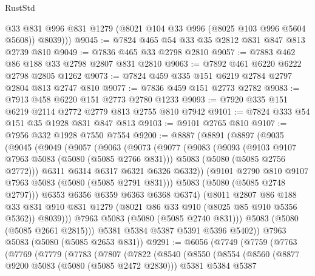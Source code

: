 \begin{lexlean}{RustStd}
\begin{coremodule}
{\begin{coremodule}
{{{{{          @33
          @831
          @996
          @831
          @1279
          (@8021 @104 @33 @996 (@8025 @103 @996 @5604 @5608))
          @8039)))
@9045 := @7824 @465 @54 @33 @35 @2812 @831 @847 @813 @2739 @810
@9049 := @7836 @465 @33 @2798 @2810
@9057 := @7883 @462 @86 @188 @33 @2798 @2807 @831 @2810
@9063 := @7892 @461 @6220 @6222 @2798 @2805 @1262
@9073 := @7824 @459 @335 @151 @6219 @2784 @2797 @2804 @813 @2747 @810
@9077 := @7836 @459 @151 @2773 @2782
@9083 := @7913 @458 @6220 @151 @2773 @2780 @1233
@9093 := @7920 @335 @151 @6219 @2114 @2772 @2779 @813 @2755 @810 @7942
@9101 := @7824 @333 @54 @151 @35 @1928 @831 @847 @813
@9103 := @9101 @2765 @810
@9107 := @7956 @332 @1928 @7550 @7554
@9200 := @8887
    (@8891
      (@8897
        (@9035
          (@9045
            (@9049
              (@9057
                (@9063
                  (@9073
                    (@9077
                      (@9083
                        (@9093
                          (@9103 @9107 @7963 @5083 (@5080 (@5085 @2766 @831)))
                          @5083
                          (@5080 (@5085 @2756 @2772)))
                        @6311
                        @6314
                        @6317
                        @6321
                        @6326
                        @6332))
                    (@9101 @2790 @810 @9107 @7963 @5083 (@5080 (@5085 @2791 @831)))
                    @5083
                    (@5080 (@5085 @2748 @2797)))
                  @6353
                  @6356
                  @6359
                  @6363
                  @6368
                  @6374)
                (@8011
                  @2807
                  @86
                  @188
                  @33
                  @831
                  @910
                  @831
                  @1279
                  (@8021 @86 @33 @910 (@8025 @85 @910 @5356 @5362))
                  @8039)))
            @7963
            @5083
            (@5080 (@5085 @2740 @831)))
          @5083
          (@5080 (@5085 @2661 @2815)))
        @5381
        @5384
        @5387
        @5391
        @5396
        @5402))
    @7963
    @5083
    (@5080 (@5085 @2653 @831))
@9291 := @6056
    (@7749
      (@7759
        (@7763
          (@7769
            (@7779
              (@7783
                (@7807
                  (@7822
                    (@8540
                      (@8550
                        (@8554
                          (@8560
                            (@8877 @9200 @5083 (@5080 (@5085 @2472 @2830)))
                            @5381
                            @5384
                            @5387
}}}}}
\end{coremodule}}
\end{coremodule}
\end{lexlean}
